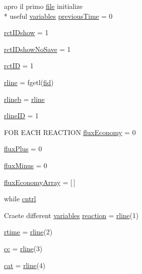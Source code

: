 \begin{DoxyCompactItemize}
\item 
apro il primo \hyperlink{a00062_a4e8353d6c62cf54bf4a1a8f63e56b8c3}{file} initialize \\*
useful \hyperlink{a00031_a075795b83d470ba58980e465541f16e9}{variables} \hyperlink{a00022_a17b8652a085b5add031a40fb1c9a680e}{previous\-Time} = 0
\item 
\hyperlink{a00022_acfa9ac92c0e448faa531767d0e6ab194}{rct\-I\-Dshow} = 1
\item 
\hyperlink{a00022_aeb449dcc9eb8bfe0321b031e10962ac5}{rct\-I\-Dshow\-No\-Save} = 1
\item 
\hyperlink{a00022_acdd7317ca799b220a16028dcd54617a1}{rct\-I\-D} = 1
\item 
\hyperlink{a00022_a81318310a01613185f6a3e6183230bd0}{rline} = fgetl(\hyperlink{a00025_ae9011d40c6f13e68e6f07156e0da7c5d}{fid})
\item 
\hyperlink{a00022_a8df79027fd85d4a3668754f36e9e88c1}{rlineb} = \hyperlink{a00022_ab5b947e1a8b7cf496ffd4eb21317052e}{rline}
\item 
\hyperlink{a00022_a8443a49765859a8631fed7e8a1d27fe5}{rline\-I\-D} = 1
\item 
F\-O\-R E\-A\-C\-H R\-E\-A\-C\-T\-I\-O\-N \hyperlink{a00022_a8acf89849d5ed6a553d46d0e413773c5}{flux\-Economy} = 0
\item 
\hyperlink{a00022_a8fc578e8d997ae0f0e3063de3566646d}{flux\-Plus} = 0
\item 
\hyperlink{a00022_a3fea311ae703b9842f1429a370657f90}{flux\-Minus} = 0
\item 
\hyperlink{a00022_a5d3cba9db002e77eaf6ffce66592841f}{flux\-Economy\-Array} = \mbox{[}$\,$\mbox{]}
\item 
while \hyperlink{a00022_aae7c98255a05b6029bdfc5e96dc2ab88}{cntrl}
\item 
Craete different \hyperlink{a00031_a075795b83d470ba58980e465541f16e9}{variables} \hyperlink{a00022_a4ba2ecb46f808729569ecce2cc1d34c6}{reaction} = \hyperlink{a00022_ab5b947e1a8b7cf496ffd4eb21317052e}{rline}(1)
\item 
\hyperlink{a00022_afc6b38657a313b9f1de2ee356910b6ee}{rtime} = \hyperlink{a00022_ab5b947e1a8b7cf496ffd4eb21317052e}{rline}(2)
\item 
\hyperlink{a00022_afb5980388a6e55ca55437b53cdaf528a}{cc} = \hyperlink{a00022_ab5b947e1a8b7cf496ffd4eb21317052e}{rline}(3)
\item 
\hyperlink{a00022_a7073f71a43389f3032e69b1fffc2551a}{cat} = \hyperlink{a00022_ab5b947e1a8b7cf496ffd4eb21317052e}{rline}(4)
\item 

\end{DoxyCompactItemize}
